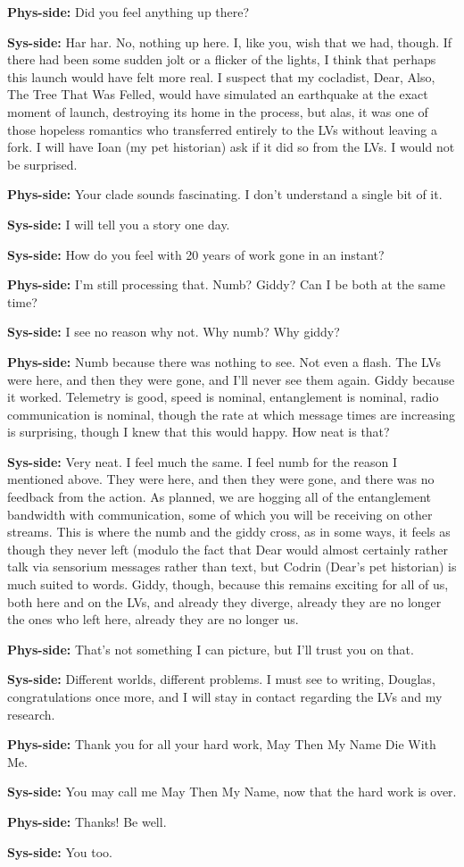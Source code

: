 \textbf{Phys-side:} Did you feel anything up there?

\textbf{Sys-side:} Har har. No, nothing up here. I, like you, wish that we had, though. If there had been some sudden jolt or a flicker of the lights, I think that perhaps this launch would have felt more real. I suspect that my cocladist, Dear, Also, The Tree That Was Felled, would have simulated an earthquake at the exact moment of launch, destroying its home in the process, but alas, it was one of those hopeless romantics who transferred entirely to the LVs without leaving a fork. I will have Ioan (my pet historian) ask if it did so from the LVs. I would not be surprised.

\textbf{Phys-side:} Your clade sounds fascinating. I don't understand a single bit of it.

\textbf{Sys-side:} I will tell you a story one day.

\textbf{Sys-side:} How do you feel with 20 years of work gone in an instant?

\textbf{Phys-side:} I'm still processing that. Numb? Giddy? Can I be both at the same time?

\textbf{Sys-side:} I see no reason why not. Why numb? Why giddy?

\textbf{Phys-side:} Numb because there was nothing to see. Not even a flash. The LVs were here, and then they were gone, and I'll never see them again. Giddy because it worked. Telemetry is good, speed is nominal, entanglement is nominal, radio communication is nominal, though the rate at which message times are increasing is surprising, though I knew that this would happy. How neat is that?

\textbf{Sys-side:} Very neat. I feel much the same. I feel numb for the reason I mentioned above. They were here, and then they were gone, and there was no feedback from the action. As planned, we are hogging all of the entanglement bandwidth with communication, some of which you will be receiving on other streams. This is where the numb and the giddy cross, as in some ways, it feels as though they never left (modulo the fact that Dear would almost certainly rather talk via sensorium messages rather than text, but Codrin (Dear's pet historian) is much suited to words. Giddy, though, because this remains exciting for all of us, both here and on the LVs, and already they diverge, already they are no longer the ones who left here, already they are no longer us.

\textbf{Phys-side:} That's not something I can picture, but I'll trust you on that.

\textbf{Sys-side:} Different worlds, different problems. I must see to writing, Douglas, congratulations once more, and I will stay in contact regarding the LVs and my research.

\textbf{Phys-side:} Thank you for all your hard work, May Then My Name Die With Me.

\textbf{Sys-side:} You may call me May Then My Name, now that the hard work is over.

\textbf{Phys-side:} Thanks! Be well.

\textbf{Sys-side:} You too.
